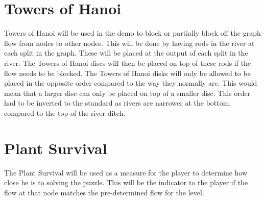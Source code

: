 \section{Towers of Hanoi}
Towers of Hanoi will be used in the demo to block or partially block off the graph flow from nodes to other nodes. This will be done by having rods in the river at each split in the graph. These will be placed at the output of each split in the river. The Towers of Hanoi discs will then be placed on top of these rods if the flow needs to be blocked. The Towers of Hanoi disks will only be allowed to be placed in the opposite order compared to the way they normally are. This would mean that a larger disc can only be placed on top of a smaller disc. This order had to be inverted to the standard as rivers are narrower at the bottom, compared to the top of the river ditch. 

\section{Plant Survival}
The Plant Survival will be used as a measure for the player to determine how close he is to solving the puzzle. This will be the indicator to the player if the flow at that node matches the pre-determined flow for the level.